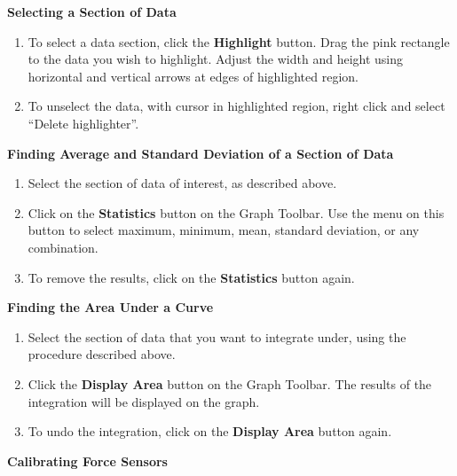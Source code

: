 \bigskip
\vspace{5mm}
\textbf{Selecting a Section of Data}

\begin{enumerate}
\item To select a data section, click the \textbf{Highlight} button.  Drag the pink rectangle to the data you wish to highlight.  Adjust the width and height using horizontal and vertical arrows at edges of highlighted region.
\item To unselect the data, with cursor in highlighted region, right click and select ``Delete highlighter''.
\end{enumerate}
\vspace{5mm}
\textbf{Finding Average and Standard Deviation of a Section of Data}

\begin{enumerate}
\item Select the section of data of interest, as described above.
\item Click on the \textbf{Statistics} button on the Graph Toolbar. Use the menu on this button to select maximum, minimum, mean, standard deviation, or any combination.
\item To remove the results, click on the \textbf{Statistics} button again.
\end{enumerate}


\pagebreak[2]
\vspace{5mm}
\textbf{Finding the Area Under a Curve}

\begin{enumerate}
\item Select the section of data that you want to integrate under, using the procedure described above.
\item Click the \textbf{Display Area} button on the Graph Toolbar.
The results of the integration will be displayed on the graph.
\item To undo the integration, click on the \textbf{Display Area} button again.
\end{enumerate}

\newpage

\textbf{Calibrating Force Sensors}

